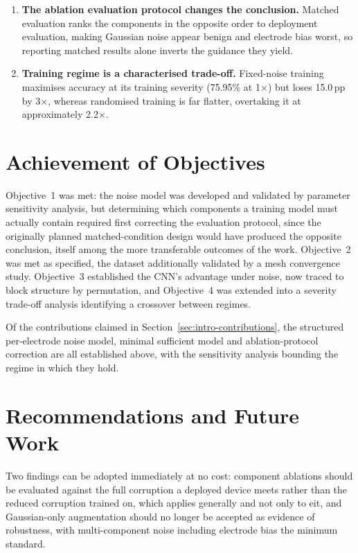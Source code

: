 \begin{enumerate}
    \item \textbf{The ablation evaluation protocol changes the conclusion.} Matched evaluation ranks the components in the opposite order to deployment evaluation, making Gaussian noise appear benign and electrode bias worst, so reporting matched results alone inverts the guidance they yield.

    \item \textbf{Training regime is a characterised trade-off.} Fixed-noise training maximises accuracy at its training severity (75.95\% at 1$\times$) but loses 15.0\,pp by 3$\times$, whereas randomised training is far flatter, overtaking it at approximately 2.2$\times$.
\end{enumerate}

\section{Achievement of Objectives}
\label{sec:conc-objectives}

Objective~1 was met: the noise model was developed and validated by parameter sensitivity analysis, but determining which components a training model must actually contain required first correcting the evaluation protocol, since the originally planned matched-condition design would have produced the opposite conclusion, itself among the more transferable outcomes of the work. Objective~2 was met as specified, the dataset additionally validated by a mesh convergence study. Objective~3 established the CNN's advantage under noise, now traced to block structure by permutation, and Objective~4 was extended into a severity trade-off analysis identifying a crossover between regimes.

Of the contributions claimed in Section~\ref{sec:intro-contributions}, the structured per-electrode noise model, minimal sufficient model and ablation-protocol correction are all established above, with the sensitivity analysis bounding the regime in which they hold.

\section{Recommendations and Future Work}
\label{sec:conc-recommendations}

Two findings can be adopted immediately at no cost: component ablations should be evaluated against the full corruption a deployed device meets rather than the reduced corruption trained on, which applies generally and not only to \gls{eit}, and Gaussian-only augmentation should no longer be accepted as evidence of robustness, with multi-component noise including electrode bias the minimum standard.


